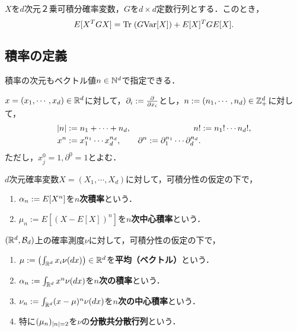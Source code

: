 \documentclass[uplatex,dvipdfmx]{jsreport}
\begin{document}
\begin{proposition}
    $X$を$d$次元２乗可積分確率変数，$G$を$d\times d$定数行列とする．このとき，
    \[E[X^TGX]=\mathrm{Tr}\;(G\mathrm{Var}[X])+E[X]^TGE[X].\]
\end{proposition}

\subsection{積率の定義}

\begin{tcolorbox}[colframe=ForestGreen, colback=ForestGreen!10!white,breakable,colbacktitle=ForestGreen!40!white,coltitle=black,fonttitle=\bfseries\sffamily,
title=]
    積率の次元もベクトル値$n\in\mathbb{N}^d$で指定できる．
\end{tcolorbox}

\begin{notation}
    $x=(x_1,\cdots,x_d)\in\mathbb{R}^d$に対して，$\partial_i:=\frac{\partial }{\partial x_i}$とし，$n:=(n_1,\cdots,n_d)\in\mathbb{Z}^d_+$に対して，
    \begin{align*}
        \lvert n\rvert&:=n_1+\cdots+n_d,&n!&:=n_1!\cdots n_d!,\\
        x^n&:=x_1^{n_1}\cdots x_d^{n_d},&\partial^n:=\partial_1^{n_1}\cdots\partial_d^{n_d}.
    \end{align*}
    ただし，$x^0_j=1,\partial^0=1$とよむ．
\end{notation}

\begin{definition}
    $d$次元確率変数$X=(X_1,\cdots,X_d)$に対して，可積分性の仮定の下で，
    \begin{enumerate}
        \item $\alpha_n:=E[X^n]$を\textbf{$n$次積率}という．
        \item $\mu_n:=E[(X-E[X])^n]$を\textbf{$n$次中心積率}という．
    \end{enumerate}
\end{definition}

\begin{definition}
    $(\mathbb{R}^d,\mathcal{B}_d)$上の確率測度$\nu$に対して，可積分性の仮定の下で，
    \begin{enumerate}
        \item $\mu:=\left(\int_{\mathbb{R}^d}x_i\nu(dx)\right)\in\mathbb{R}^d$を\textbf{平均（ベクトル）}という．
        \item $\alpha_n:=\int_{\mathbb{R}^d}x^n\nu(dx)$を\textbf{$n$次の積率}という．
        \item $\nu_n:=\int_{\mathbb{R}^d}(x-\mu)^n\nu(dx)$を\textbf{$n$次の中心積率}という．
        \item 特に$(\mu_n)_{\lvert n\rvert=2}$を$\nu$の\textbf{分散共分散行列}という．
    \end{enumerate}
\end{definition}
\end{document}
